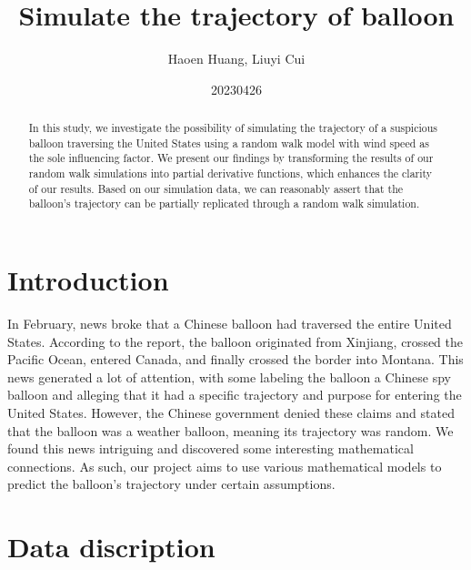 \documentclass{article}
\title{Simulate the trajectory of balloon}
\author{Haoen Huang, Liuyi Cui}
\date{20230426}
\begin{document}
\maketitle

\begin{abstract}
In this study, we investigate the possibility of simulating the trajectory of a suspicious balloon traversing the United States using a random walk model with wind speed as the sole influencing factor. We present our findings by transforming the results of our random walk simulations into partial derivative functions, which enhances the clarity of our results. Based on our simulation data, we can reasonably assert that the balloon's trajectory can be partially replicated through a random walk simulation.
\end{abstract}
\setlength{\columnsep}{1cm}
\begin{multicols}{2}
\section{Introduction}
In February, news broke that a Chinese balloon had traversed the entire United States. According to the report, the balloon originated from Xinjiang, crossed the Pacific Ocean, entered Canada, and finally crossed the border into Montana. This news generated a lot of attention, with some labeling the balloon a Chinese spy balloon and alleging that it had a specific trajectory and purpose for entering the United States. However, the Chinese government denied these claims and stated that the balloon was a weather balloon, meaning its trajectory was random. We found this news intriguing and discovered some interesting mathematical connections. As such, our project aims to use various mathematical models to predict the balloon's trajectory under certain assumptions.





\section{Data discription}



\end{multicols}
\end{document}
